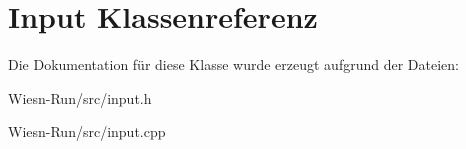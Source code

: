 \hypertarget{classInput}{\section{Input Klassenreferenz}
\label{classInput}
}


Die Dokumentation für diese Klasse wurde erzeugt aufgrund der Dateien\-:\begin{DoxyCompactItemize}
\item 
Wiesn-\/\-Run/src/input.\-h\item 
Wiesn-\/\-Run/src/input.\-cpp\end{DoxyCompactItemize}
